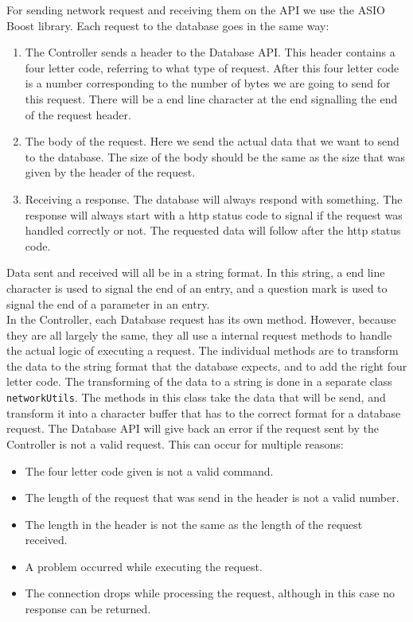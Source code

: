 \documentclass[../Main.tex]{subfiles}
\begin{document}
For sending network request and receiving them on the API we use the ASIO Boost library\cite{boost}. Each request to the database goes in the same way:
\begin{enumerate}
    \item The Controller sends a header to the Database API. This header contains a four letter code, referring to what type of request. After this four letter code is a number corresponding to the number of bytes we are going to send for this request. There will be a end line character at the end signalling the end of the request header. 
    \item The body of the request. Here we send the actual data that we want to send to the database. The size of the body should be the same as the size that was given by the header of the request.
    \item Receiving a response. The database will always respond with something. The response will always start with a http status code to signal if the request was handled correctly or not. The requested data will follow after the http status code.
\end{enumerate}
Data sent and received will all be in a string format. In this string, a end line character is used to signal the end of an entry, and a question mark is used to signal the end of a parameter in an entry.\\
In the Controller, each Database request has its own method. However, because they are all largely the same, they all use a internal request methods to handle the actual logic of executing a request. The individual methods are to transform the data to the string format that the database expects, and to add the right four letter code. The transforming of the data to a string is done in a separate class \texttt{networkUtils}. The methods in this class take the data that will be send, and transform it into a character buffer that has to the correct format for a database request.
The Database API will give back an error if the request sent by the Controller is not a valid request. This can occur for multiple reasons:
\begin{itemize}
    \item The four letter code given is not a valid command.
    \item The length of the request that was send in the header is not a valid number.
    \item The length in the header is not the same as the length of the request received.
    \item A problem occurred while executing the request.
    \item The connection drops while processing the request, although in this case no response can be returned.
\end{itemize}
\end{document}
